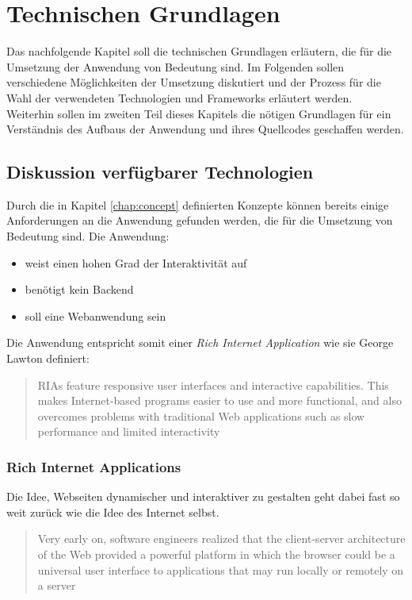\chapter{Technischen Grundlagen}
\thispagestyle{fancy}
Das nachfolgende Kapitel soll die technischen Grundlagen erläutern, die für die Umsetzung der Anwendung von Bedeutung sind. Im Folgenden sollen verschiedene Möglichkeiten der Umsetzung diskutiert und der Prozess für die Wahl der verwendeten Technologien und Frameworks erläutert werden.\\
Weiterhin sollen im zweiten Teil dieses Kapitels die nötigen Grundlagen für ein Verständnis des Aufbaus der Anwendung und ihres Quellcodes geschaffen werden.

\section{Diskussion verfügbarer Technologien}
Durch die in Kapitel \ref{chap:concept} definierten Konzepte können bereits einige Anforderungen an die Anwendung gefunden werden, die für die Umsetzung von Bedeutung sind.
Die Anwendung:

\begin{itemize}
  \item weist einen hohen Grad der Interaktivität auf
  \item benötigt kein Backend
  \item soll eine Webanwendung sein
\end{itemize}

Die Anwendung entspricht somit einer \textit{Rich Internet Application} wie sie George Lawton definiert:

\begin{quote}
  RIAs feature responsive user interfaces and interactive capabilities. This makes Internet-based programs easier to use and more functional, and also overcomes problems with traditional Web applications such as slow performance and limited interactivity \cite{lawton2008new}
\end{quote}

\subsection{Rich Internet Applications}
Die Idee, Webseiten dynamischer und interaktiver zu gestalten geht dabei fast so weit zurück wie die Idee des Internet selbst.

\begin{quote}
  Very early on, software engineers realized that the client-server architecture of the Web provided a powerful platform in which the browser could be a universal user interface to applications that may run locally or remotely on a server \cite{Jazayeri:2007:TWA:1253532.1254719}
\end{quote}

